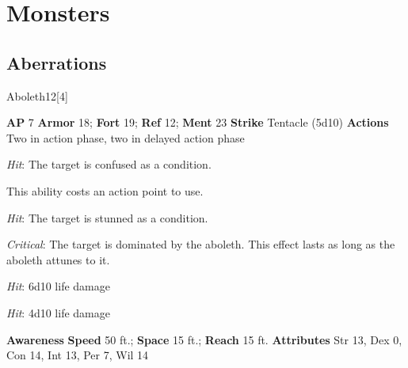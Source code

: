 \chapter{Monsters}
\section{Aberrations}
\begin{monsection}{Aboleth}{12}[4]
\vspace{-1em}\vspace{-1em}
\begin{spellcontent}
\begin{spelltargetinginfo}
{\textbf{AP} 7}
\pari \textbf{Armor} 18;
\textbf{Fort} 19;
\textbf{Ref} 12;
\textbf{Ment} 23
\pari \textbf{Strike} Tentacle  (5d10)
\pari \textbf{Actions} Two in action phase, two in delayed action phase
\end{spelltargetinginfo}
\begin{spelleffects}
\pari
{}
\par
\par \textit{Hit}: The target is confused as a condition.
\vspace{0.5em}
\pari
{}
\par
This ability costs an action point to use.
\par \textit{Hit}: The target is stunned as a condition.
\par \textit{Critical}:
The target is dominated by the aboleth.
This effect lasts as long as the aboleth attunes to it.
\vspace{0.5em}
\pari
{}
\par
\par \textit{Hit}: 6d10 life damage
\vspace{0.5em}
\pari
{}
\par
\par \textit{Hit}: 4d10 life damage
\end{spelleffects}
\end{spellcontent}
\begin{spellsubcontent}
\begin{spellfooter}
\pari \textbf{Awareness} 
\pari \textbf{Speed} 50 ft.;
\textbf{Space} 15 ft.;
\textbf{Reach} 15 ft.
\pari \textbf{Attributes}
Str 13,
Dex 0,
Con 14,
Int 13,
Per 7,
Wil 14
\end{spellfooter}
\end{spellsubcontent}
\end{monsection}
